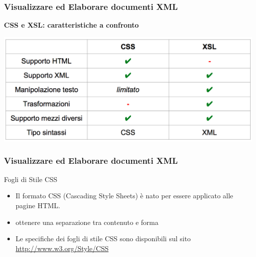 \documentclass{beamer}
\begin{document}
    \begin{frame}
        \frametitle{Visualizzare ed Elaborare documenti XML}
        \addtocounter{nframe}{1}
        \begin{center}
            \textbf{CSS e XSL: caratteristiche a confronto}
        \end{center}
       
        \begin{center}
            \includegraphics[width=.9\textwidth]{imgs/css-xsl.png}
        \end{center}
    
    \end{frame}

    \begin{frame}
        \frametitle{Visualizzare ed Elaborare documenti XML}
        \addtocounter{nframe}{1}
        
        \begin{block}{Fogli di Stile CSS}
           
           \begin{itemize}
               \item Il formato CSS (Cascading Style Sheets) è nato per essere applicato alle pagine HTML.
               \item ottenere una separazione tra contenuto e forma
               \item Le specifiche dei fogli di stile CSS sono disponibili sul sito \url{http://www.w3.org/Style/CSS}
           \end{itemize}
        \end{block}
        
    \end{frame}
\end{document}
